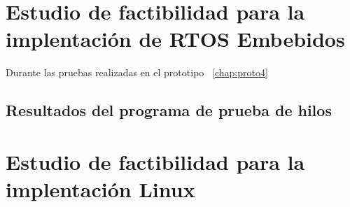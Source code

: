	\section{Estudio de factibilidad para la implentación de RTOS Embebidos}
	Durante las pruebas realizadas en el prototipo ~\ref{chap:proto4}	

	
		\subsection{Resultados del programa de prueba de hilos}
		
			
		
	
	\section{Estudio de factibilidad para la implentación Linux}
	
	
	 